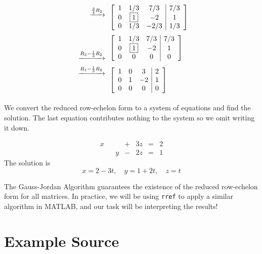 \documentclass{ximera}
\begin{document}
\begin{example}
\begin{explanation}
\begin{align*}
\begin{array}{c}
 \xrightarrow{\frac{3}{4}R_2}\\
\\
\end{array}
&\left[\begin{array}{ccc|c} 
 1&1/3&7/3&7/3\\0&\fbox{$1$}&-2&1\\0&1/3&-2/3&1/3
 \end{array}\right]\\
 \begin{array}{c}
\\
\\
 \xrightarrow{R_3-\frac{1}{3}R_2}\\
\end{array}
&\left[\begin{array}{ccc|c} 
 1&1/3&7/3&7/3\\0&\fbox{$1$}&-2&1\\0&0&0&0
 \end{array}\right]\\
 \begin{array}{c}
 \xrightarrow{R_1-\frac{1}{3}R_2}\\
 \\
\\
\end{array}
&\left[\begin{array}{ccc|c} 
 1&0&3&2\\0&1&-2&1\\0&0&0&0
 \end{array}\right]
 \end{align*}
  
 We convert the reduced row-echelon form to a system of equations and find the solution.  The last equation contributes nothing to the system so we omit writing it down.
  
 $$\begin{array}{ccccccccc}
      x & &&+&3z&= &2 \\
     & &y&-&2z&=&1
    \end{array}$$
    The solution is
    $$x=2-3t,\quad y=1+2t,\quad z=t$$
\end{explanation}
\end{example}

The Gauss-Jordan Algorithm guarantees the existence of the reduced row-echelon form for all matrices. In practice, we will be using \texttt{rref} to apply a similar algorithm in MATLAB, and our task will be interpreting the results!

\section*{Example Source}
\end{document}
